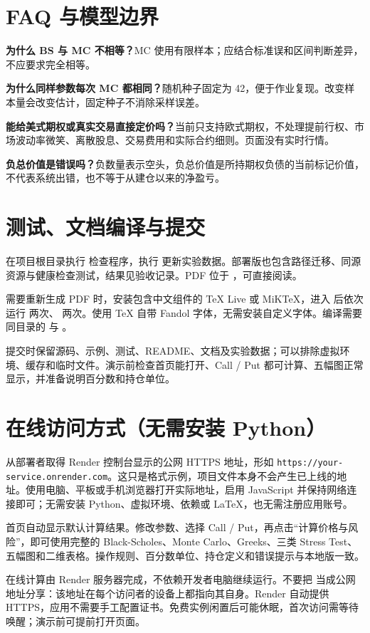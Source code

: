 \documentclass[UTF8,a4paper,12pt]{ctexart}
\begin{document}
\section{FAQ 与模型边界}
\textbf{为什么 BS 与 MC 不相等？}MC 使用有限样本；应结合标准误和区间判断差异，不应要求完全相等。

\textbf{为什么同样参数每次 MC 都相同？}随机种子固定为 42，便于作业复现。改变样本量会改变估计，固定种子不消除采样误差。

\textbf{能给美式期权或真实交易直接定价吗？}当前只支持欧式期权，不处理提前行权、市场波动率微笑、离散股息、交易费用和实际合约细则。页面没有实时行情。

\textbf{负总价值是错误吗？}负数量表示空头，负总价值是所持期权负债的当前标记价值，不代表系统出错，也不等于从建仓以来的净盈亏。

\section{测试、文档编译与提交}
在项目根目录执行  检查程序，执行  更新实验数据。部署版也包含路径迁移、同源资源与健康检查测试，结果见验收记录。PDF 位于 ，可直接阅读。

需要重新生成 PDF 时，安装包含中文组件的 TeX Live 或 MiKTeX，进入  后依次运行  两次、 两次。使用 TeX 自带 Fandol 字体，无需安装自定义字体。编译需要同目录的  与 。

提交时保留源码、示例、测试、README、文档及实验数据；可以排除虚拟环境、缓存和临时文件。演示前检查首页能打开、Call / Put 都可计算、五幅图正常显示，并准备说明百分数和持仓单位。
\newpage
\section{在线访问方式（无需安装 Python）}
从部署者取得 Render 控制台显示的公网 HTTPS 地址，形如
\nolinkurl{https://your-service.onrender.com}。这只是格式示例，项目文件本身不会产生已上线的地址。使用电脑、平板或手机浏览器打开实际地址，启用 JavaScript 并保持网络连接即可；无需安装 Python、虚拟环境、依赖或 LaTeX，也无需注册应用账号。

首页自动显示默认计算结果。修改参数、选择 Call / Put，再点击“计算价格与风险”，即可使用完整的 Black-Scholes、Monte Carlo、Greeks、三类 Stress Test、五幅图和二维表格。操作规则、百分数单位、持仓定义和错误提示与本地版一致。

在线计算由 Render 服务器完成，不依赖开发者电脑继续运行。不要把  当成公网地址分享：该地址在每个访问者的设备上都指向其自身。Render 自动提供 HTTPS，应用不需要手工配置证书。免费实例闲置后可能休眠，首次访问需等待唤醒；演示前可提前打开页面。
\end{document}
